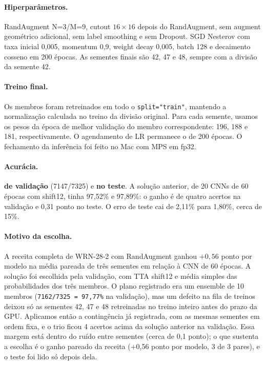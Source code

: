 \documentclass[11pt,a4paper]{article}
\begin{document}
\paragraph{Hiperparâmetros.} RandAugment N=3/M=9, cutout $16\times16$ depois do RandAugment, sem augment
geométrico adicional, sem label smoothing e sem Dropout. SGD Nesterov com taxa inicial 0,005,
momentum 0,9, weight decay 0,005, batch 128 e decaimento cosseno em 200 épocas.
As sementes finais são 42, 47 e 48, sempre com a divisão da semente 42.

\paragraph{Treino final.} Os membros foram retreinados em todo o \texttt{split="train"}, mantendo a
normalização calculada no treino da divisão original. Para cada semente, usamos os pesos da época de
melhor validação do membro correspondente: 196, 188 e 181, respectivamente. O agendamento de LR
permanece o de 200 épocas. O fechamento da inferência foi feito no Mac com MPS em fp32.

\paragraph{Acurácia.} \textbf{\valFinal{} de validação} (7147/7325) e \textbf{\testeFinal{} no teste}.
A solução anterior, de 20 CNNs de 60 épocas com shift12, tinha 97,52\% e 97,89\%: o ganho é de quatro
acertos na validação e 0,31 ponto no teste. O erro de teste cai de 2,11\% para 1,80\%, cerca de 15\%.

\paragraph{Motivo da escolha.} A receita completa de WRN-28-2 com RandAugment ganhou $+0{,}56$ ponto
por modelo na média pareada de três sementes em relação à CNN de 60 épocas. A solução foi escolhida
pela validação, com TTA shift12 e média simples das probabilidades dos três membros.
O plano registrado era um ensemble de 10 membros (\texttt{7162/7325 = 97,77\%} na validação), mas um defeito na fila
de treinos deixou só as sementes 42, 47 e 48 retreinadas no treino inteiro antes do prazo da GPU. Aplicamos então a
contingência já registrada, com as mesmas sementes em ordem fixa, e o trio ficou 4 acertos acima da solução
anterior na validação. Essa margem está dentro do ruído entre sementes (cerca de 0,1 ponto); o que sustenta a escolha é
o ganho pareado da receita (+0,56 ponto por modelo, 3 de 3 pares), e o teste foi lido só depois dela.
\end{document}
